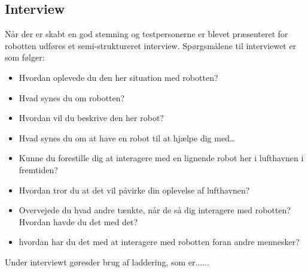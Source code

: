 \subsection{Interview}
\label{ParametreInterview}
%
Når der er skabt en god stemning og testpersonerne er blevet præsenteret for robotten udføres et semi-struktureret interview. Spørgsmålene til interviewet er som følger:\blankline
%
\begin{itemize}
	\item Hvordan oplevede du den her situation med robotten?
	\item Hvad synes du om robotten?
	\item Hvordan vil du beskrive den her robot?
	\item Hvad synes du om at have en robot til at hjælpe dig med…
	\item Kunne du forestille dig at interagere med en lignende robot her i lufthavnen i fremtiden?
	\item Hvordan tror du at det vil påvirke din oplevelse af lufthavnen?
	\item Overvejede du hvad andre tænkte, når de så dig interagere med robotten? Hvordan havde du det med det?
	\item hvordan har du det med at interagere med robotten foran andre mennesker?\blankline
\end{itemize}
%
Under interviewt gøresder brug af laddering, som er......


